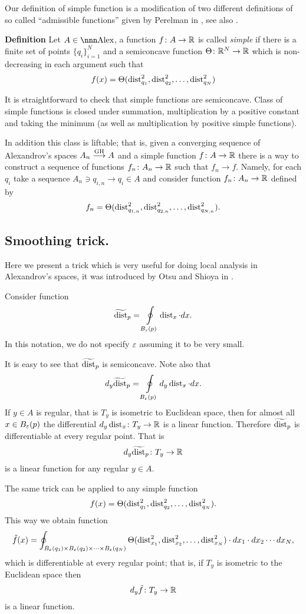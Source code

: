 \documentclass{article}
\begin{document}
Our definition of simple function is a modification of two different definitions of so called ``admissible functions'' given by Perelman in
\cite[3.2]{perelman:morse}, see also \cite[5.1]{kapovitch:stability}. 

\begin{thm}{\bf Definition} Let $A\in \Alex$, a function $f\colon A\to \mathbb{R}$ is called
\emph{simple} if there is a finite set of points $\{q_i\}_{i=1}^N$ and a
semiconcave function $\Theta\colon\mathbb{R}^N\to\mathbb{R}$ which is non-decreasing in each
argument such that
$$f(x)= \Theta(\operatorname{dist}_{q_1}^2,\operatorname{dist}_{q_2}^2,\dots,\operatorname{dist}_{q_N}^2)$$
\end{thm}

It is straightforward to check that simple functions are semiconcave. Class of simple functions is
closed under summation, multiplication by a positive constant
and taking the minimum (as well as multiplication by positive simple functions).

In addition this class is liftable; 
that is, given a converging sequence of
Alexandrov's spaces $A_n\GHto A$ and a simple function $f\colon A\to\mathbb{R}$ there is a
way to construct a sequence of functions $f_n\colon A_n\to\mathbb{R}$ such that $f_n\to f$.
Namely, for each $q_i$ take a sequence $A_n\ni q_{i,n}\to q_i\in A$ and consider
function $f_n\colon A_n\to\mathbb{R}$ defined by
$$f_n=\Theta(\operatorname{dist}_{q_{1,n}}^2,\operatorname{dist}_{q_{2,n}}^2,\dots,\operatorname{dist}_{q_{N,n}}^2).$$


\subsection{Smoothing trick.}\label{smooth}
Here we present a trick which is very useful for doing local analysis in
Alexandrov's spaces, it was introduced by Otsu and Shioya in \cite[section 5]{otsu-shioya}.

Consider function
$$\widetilde{\operatorname{dist}}_p=\oint\limits_{B_\varepsilon(p)}\operatorname{dist}_x\cdot d x.$$
In this notation, we do not specify $\varepsilon$ assuming it
to be very small.

It is easy to see that $\widetilde{\operatorname{dist}}_p$ is semiconcave.
Note also that 
$$d_y\widetilde{\operatorname{dist}}_p
=
\oint\limits_{B_\varepsilon(p)}d_y\operatorname{dist}_x\cdot d x.$$
If $y\in A$ is regular, 
that is $T_y$ is isometric to Euclidean space, 
then for almost all $x\in B_\varepsilon(p)$ the differential $d_y\operatorname{dist}_x\colon T_y\to\mathbb{R}$ is
a linear function.
Therefore $\widetilde{\operatorname{dist}}_p$ is differentiable at every regular point.
That is 
$$d_y\widetilde{\operatorname{dist}}_p\colon T_y\to\mathbb{R}$$
is a linear function for any regular $y\in A$.

The same trick can be applied to any simple function
$$f(x)=\Theta(\operatorname{dist}_{q_1}^2,\operatorname{dist}_{q_2}^2,\dots,\operatorname{dist}_{q_N}^2).$$
This way we obtain function
$$\tilde f(x)=
\oint_{B_\varepsilon(q_1)\times B_\varepsilon(q_2)\times\cdots\times B_\varepsilon(q_N)}
\Theta(\operatorname{dist}_{x_1}^2,\operatorname{dist}_{x_2}^2,\dots,\operatorname{dist}_{x_N}^2)
\cdot d x_1\cdot d x_2\cdots d x_N,$$
which is differentiable at every regular point;
that is, if $T_y$ is isometric to
the Euclidean space then 
$$d_y\tilde f\colon T_y\to\mathbb{R}$$
is a linear function.
\end{document}
